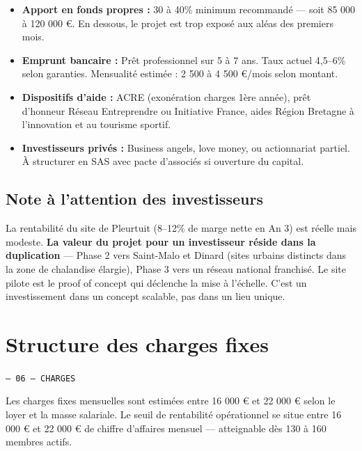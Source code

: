 \documentclass[11pt, a4paper]{article}
\newcommand{\eyebrow}[1]{%
  \vspace{4pt}
  {\small\color{fc-ink3}\texttt{— #1}}
  \vspace{2pt}
}
\begin{document}
\begin{itemize}
  \item \textbf{Apport en fonds propres :} 30 à 40\% minimum recommandé — soit 85 000 à 120 000 €. En dessous, le projet est trop exposé aux aléas des premiers mois.
  \item \textbf{Emprunt bancaire :} Prêt professionnel sur 5 à 7 ans. Taux actuel 4,5–6\% selon garanties. Mensualité estimée : 2 500 à 4 500 €/mois selon montant.
  \item \textbf{Dispositifs d'aide :} ACRE (exonération charges 1ère année), prêt d'honneur Réseau Entreprendre ou Initiative France, aides Région Bretagne à l'innovation et au tourisme sportif.
  \item \textbf{Investisseurs privés :} Business angels, love money, ou actionnariat partiel. À structurer en SAS avec pacte d'associés si ouverture du capital.
\end{itemize}

\subsection{Note à l'attention des investisseurs}

La rentabilité du site de Pleurtuit (8–12\% de marge nette en An 3) est réelle mais modeste. \textbf{La valeur du projet pour un investisseur réside dans la duplication} — Phase 2 vers Saint-Malo et Dinard (sites urbains distincts dans la zone de chalandise élargie), Phase 3 vers un réseau national franchisé. Le site pilote est le proof of concept qui déclenche la mise à l'échelle. C'est un investissement dans un concept scalable, pas dans un lieu unique.

\section{Structure des charges fixes}
\eyebrow{06 — CHARGES}

Les charges fixes mensuelles sont estimées entre 16 000 € et 22 000 € selon le loyer et la masse salariale. Le seuil de rentabilité opérationnel se situe entre 16 000 € et 22 000 € de chiffre d'affaires mensuel — atteignable dès 130 à 160 membres actifs.
\end{document}
